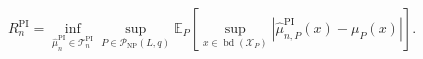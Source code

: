 \[
 R_n^{\mathrm{PI}}
 =\inf_{\widehat\mu_n^{\mathrm{PI}}\in\mathcal T_n^{\mathrm{PI}}}
 \sup_{P\in\mathcal P_{\mathrm{NP}}(L,q)}
 \mathbb E_P\!\left[
 \sup_{x\in\operatorname{bd}(\mathcal X_P)}
 \left|\widehat\mu_{n,P}^{\mathrm{PI}}(x)-\mu_P(x)\right|
 \right].
\]